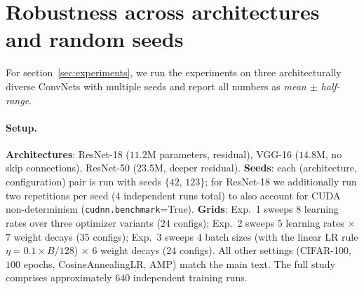 \section{Robustness across architectures and random seeds}\label{Appendix:robustness}

For section~\ref{sec:experiments}, we run the experiments on three architecturally diverse ConvNets with multiple seeds and report all numbers as \emph{mean $\pm$ half-range}.

\paragraph{Setup.}
\textbf{Architectures}: ResNet-18 ($11.2$M parameters, residual), VGG-16 ($14.8$M, no skip connections), ResNet-50 ($23.5$M, deeper residual). \textbf{Seeds}: each (architecture, configuration) pair is run with seeds $\{42,\,123\}$; for ResNet-18 we additionally run two repetitions per seed (4 independent runs total) to also account for CUDA non-determinism (\texttt{cudnn.benchmark}=True). \textbf{Grids}: Exp.~1 sweeps $8$ learning rates over three optimizer variants ($24$ configs); Exp.~2 sweeps $5$ learning rates $\times$ $7$ weight decays ($35$ configs); Exp.~3 sweeps $4$ batch sizes (with the linear LR rule $\eta=0.1\times B/128$) $\times$ $6$ weight decays ($24$ configs). All other settings (CIFAR-100, $100$ epochs, CosineAnnealingLR, AMP) match the main text. The full study comprises approximately $640$ independent training runs.



